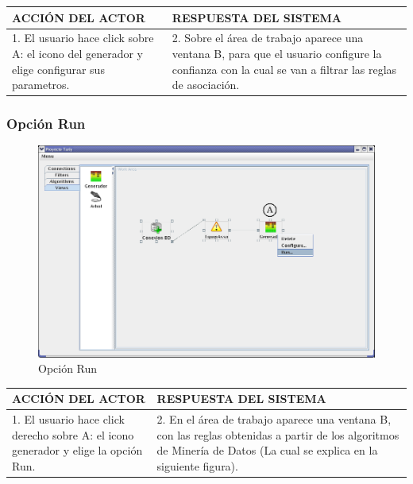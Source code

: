 \begin{center}
\begin{tabular}{|p{60mm}|p{60mm}|}\hline
ACCI\'ON DEL ACTOR & RESPUESTA DEL SISTEMA \\ \hline
1. El usuario hace click sobre A: el icono del generador y elige configurar sus parametros.
& 2. Sobre el \'area de trabajo aparece una ventana B, para que el usuario configure la confianza con la cual se van a
filtrar las reglas de asociaci\'on. \\ \hline
\end{tabular}
\end{center}
\newpage

\subsubsection{Opci\'on Run}
\begin{figure}[h]
 \centering
 \includegraphics[width=1\textwidth]{images/v0m3.png}
 \caption{Opci\'on Run}
\end{figure}

\begin{center}
\begin{tabular}{|p{60mm}|p{60mm}|}\hline
ACCI\'ON DEL ACTOR & RESPUESTA DEL SISTEMA \\ \hline
1. El usuario hace click derecho sobre A: el icono generador y elige la opci\'on Run.
& 2. En el \'area de trabajo aparece una ventana B, con las reglas obtenidas a partir de los algoritmos de Miner\'ia de
Datos (La cual se explica en la siguiente figura). \\ \hline
\end{tabular}
\end{center}
\newpage


